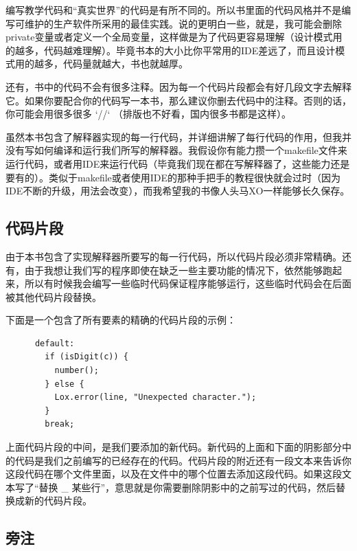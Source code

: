 \documentclass[cn,10pt,math=newtx,citestyle=gb7714-2015,bibstyle=gb7714-2015]{elegantbook}
\newenvironment{code}{\captionsetup{type=listing}}{}
\begin{document}
编写教学代码和“真实世界”的代码是有所不同的。所以书里面的代码风格并不是编写可维护的生产软件所采用的最佳实践。说的更明白一些，就是，我可能会删除private变量或者定义一个全局变量，这样做是为了代码更容易理解（设计模式用的越多，代码越难理解）。毕竟书本的大小比你平常用的IDE差远了，而且设计模式用的越多，代码量就越大，书也就越厚。

还有，书中的代码不会有很多注释。因为每一个代码片段都会有好几段文字去解释它。如果你要配合你的代码写一本书，那么建议你删去代码中的注释。否则的话，你可能会用很多很多 `//` （排版也不好看，国内很多书都是这样）。

虽然本书包含了解释器实现的每一行代码，并详细讲解了每行代码的作用，但我并没有写如何编译和运行我们所写的解释器。我假设你有能力攒一个makefile文件来运行代码，或者用IDE来运行代码（毕竟我们现在都在写解释器了，这些能力还是要有的）。类似于makefile或者使用IDE的那种手把手的教程很快就会过时（因为IDE不断的升级，用法会改变），而我希望我的书像人头马XO一样能够长久保存。

\subsection{代码片段}

由于本书包含了实现解释器所要写的每一行代码，所以代码片段必须非常精确。还有，由于我想让我们写的程序即使在缺乏一些主要功能的情况下，依然能够跑起来，所以有时候我会编写一些临时代码保证程序能够运行，这些临时代码会在后面被其他代码片段替换。

下面是一个包含了所有要素的精确的代码片段的示例：

\begin{code}
\begin{verbatim}
      default:
        if (isDigit(c)) {
          number();
        } else {
          Lox.error(line, "Unexpected character.");
        }
        break;
\end{verbatim}
\end{code}

上面代码片段的中间，是我们要添加的新代码。新代码的上面和下面的阴影部分中的代码是我们之前编写的已经存在的代码。代码片段的附近还有一段文本来告诉你这段代码在哪个文件里面，以及在文件中的哪个位置去添加这段代码。如果这段文本写了“替换 \_ 某些行”，意思就是你需要删除阴影中的之前写过的代码，然后替换成新的代码片段。

\subsection{旁注}
\end{document}
